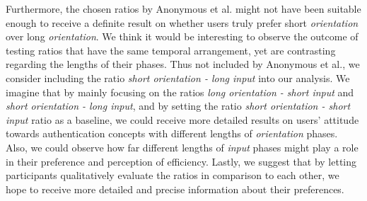 Furthermore, the chosen ratios by Anonymous et al. \cite{anonymous} might not have been suitable enough to receive a definite result on whether users truly prefer short \textit{orientation} over long \textit{orientation}. We think it would be interesting to observe the outcome of testing ratios that have the same temporal arrangement, yet are contrasting regarding the lengths of their phases. Thus not included by Anonymous et al., we consider including the ratio \textit{short orientation - long input} into our analysis. We imagine that by mainly focusing on the ratios \textit{long orientation - short input} and \textit{short orientation - long input}, and by setting the ratio \textit{short orientation - short input} ratio as a baseline, we could receive more detailed results on users' attitude towards authentication concepts with different lengths of \textit{orientation} phases. Also, we could observe how far different lengths of \textit{input} phases might play a role in their preference and perception of efficiency. Lastly, we suggest that by letting participants qualitatively evaluate the ratios in comparison to each other, we hope to receive more detailed and precise information about their preferences.  







